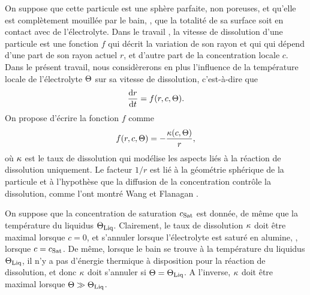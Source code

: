 On suppose que cette particule est une sphère parfaite, non
poreuses, et qu'elle est complètement mouillée par le bain, \ie, que
la totalité de sa surface soit en contact avec de l'électrolyte. Dans le
travail \cite{Hofer2011}, la vitesse de dissolution d'une particule
est une fonction $f$ qui décrit la variation de son rayon et qui qui
dépend d'une part de son rayon actuel $r$, et d'autre part de la
concentration locale $c$. Dans le présent travail, nous considèrerons
en plus l'influence de la température locale de l'électrolyte
$\Theta$ sur sa vitesse de dissolution, c'est-à-dire que
\begin{equation}\label{eq:radius-edo}
  \frac{\mathrm dr}{\mathrm dt} = f(r, c, \Theta).
\end{equation}
On propose d'écrire la fonction $f$ comme
\begin{equation}\label{eq:dissolution-velocity}
  f(r, c, \Theta) = -\frac{\kappa(c, \Theta)}{r},
\end{equation}
où $\kappa$ est le taux de dissolution qui modélise les
aspects liés à la réaction de dissolution uniquement. Le facteur $1/r$
est lié à la géométrie sphérique de la particule et à l'hypothèse que
la diffusion de la concentration contrôle la dissolution, comme l'ont
montré Wang et Flanagan \cite{Wang1999}.

On suppose que la concentration de saturation $c_\text{Sat}$ est donnée, de
même que la température du liquidus $\Theta_\text{Liq}$. Clairement, le taux de
dissolution $\kappa$ doit être maximal lorsque $c = 0$, et
s'annuler lorsque l'électrolyte est saturé en alumine, \ie, lorsque $c
= c_\text{Sat}$. De même, lorsque le bain se trouve à la température du
liquidus $\Theta_\text{Liq}$, il n'y a pas d'énergie thermique à disposition pour
la réaction de dissolution, et donc $\kappa$ doit s'annuler
si $\Theta = \Theta_\text{Liq}$. A l'inverse, $\kappa$ doit être
maximal lorsque $\Theta\gg\Theta_\text{Liq}$.

